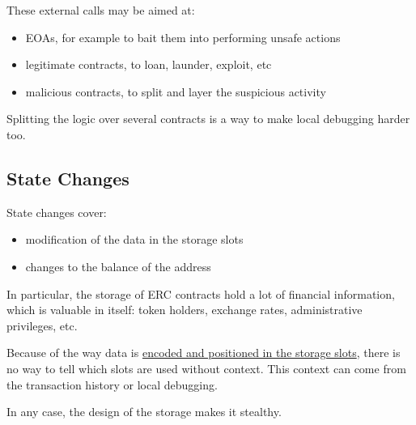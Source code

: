 These external calls may be aimed at:

\begin{itemize}
\item{EOAs, for example to bait them into performing unsafe actions}
\item{legitimate contracts, to loan, launder, exploit, etc}
\item{malicious contracts, to split and layer the suspicious activity}
\end{itemize}

Splitting the logic over several contracts is a way to make local debugging harder too.

\subsection{State Changes}

State changes cover:

\begin{itemize}
\item{modification of the data in the storage slots}
\item{changes to the balance of the address}
\end{itemize}

In particular, the storage of ERC contracts hold a lot of financial information, which is valuable in itself:
token holders, exchange rates, administrative privileges, etc.

Because of the way data is \href{\urldocsstoragelayout}{encoded and positioned in the storage slots}, there is no way to tell which slots are used without context.
This context can come from the transaction history or local debugging.

In any case, the design of the storage makes it stealthy.
